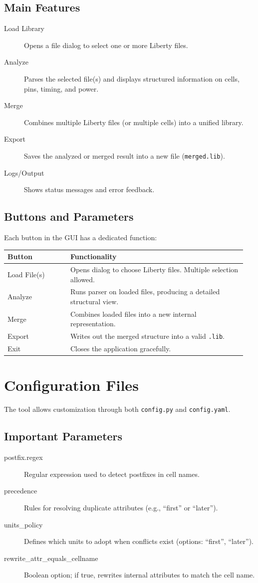 \documentclass[12pt,a4paper]{article}
\begin{document}
\subsection{Main Features}
\begin{description}
    \item[Load Library] Opens a file dialog to select one or more Liberty files.
    \item[Analyze] Parses the selected file(s) and displays structured information on cells, pins, timing, and power.
    \item[Merge] Combines multiple Liberty files (or multiple cells) into a unified library.
    \item[Export] Saves the analyzed or merged result into a new file (\texttt{merged.lib}).
    \item[Logs/Output] Shows status messages and error feedback.
\end{description}

\subsection{Buttons and Parameters}
Each button in the GUI has a dedicated function:
\begin{longtable}{p{0.25\linewidth}p{0.7\linewidth}}
\textbf{Button} & \textbf{Functionality} \\ \hline
Load File(s) & Opens dialog to choose Liberty files. Multiple selection allowed. \\
Analyze & Runs parser on loaded files, producing a detailed structural view. \\
Merge & Combines loaded files into a new internal representation. \\
Export & Writes out the merged structure into a valid \texttt{.lib}. \\
Exit & Closes the application gracefully. \\
\end{longtable}

\newpage
\section{Configuration Files}
The tool allows customization through both \texttt{config.py} and \texttt{config.yaml}.

\subsection{Important Parameters}
\begin{description}
    \item[postfix.regex] Regular expression used to detect postfixes in cell names.
    \item[precedence] Rules for resolving duplicate attributes (e.g., ``first'' or ``later'').
    \item[units\_policy] Defines which units to adopt when conflicts exist (options: ``first'', ``later'').
    \item[rewrite\_attr\_equals\_cellname] Boolean option; if true, rewrites internal attributes to match the cell name.
\end{description}
\end{document}
